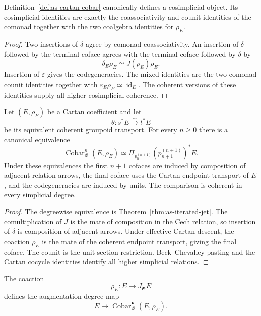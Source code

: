 \begin{proposition}
\label{prop:as-cartan-cobar-cosimplicial}
Definition~\ref{def:as-cartan-cobar} canonically defines a cosimplicial
object.  Its cosimplicial identities are exactly the coassociativity and
counit identities of the comonad together with the two coalgebra identities
for $\rho_E$.
\end{proposition}

\begin{proof}
Two insertions of $\delta$ agree by comonad coassociativity.  An insertion of
$\delta$ followed by the terminal coface agrees with the terminal coface
followed by $\delta$ by
\[
    \delta_E\rho_E
    \simeq
    J(\rho_E)\rho_E.
\]
Insertion of $\varepsilon$ gives the codegeneracies.  The mixed identities
are the two comonad counit identities together with
$\varepsilon_E\rho_E\simeq\operatorname{id}_E$.  The coherent versions of
these identities supply all higher cosimplicial coherence.
\end{proof}

\begin{theorem}
\label{thm:as-jet-cech-cobar}
Let $(E,\rho_E)$ be a Cartan coefficient and let
\[
    \theta:s^*E\xrightarrow{\sim}t^*E
\]
be its equivalent coherent groupoid transport.  For every $n\geq0$ there is
a canonical equivalence
\[
\boxed{
    \operatorname{Cobar}_{\mathfrak G}^{n}(E,\rho_E)
    \simeq
    \Pi_{p_0^{(n+1)}}
    (p_{n+1}^{(n+1)})^*E.
}
\]
Under these equivalences the first $n+1$ cofaces are induced by composition
of adjacent relation arrows, the final coface uses the Cartan endpoint
transport of $E$, and the codegeneracies are induced by units.  The
comparison is coherent in every simplicial degree.
\end{theorem}

\begin{proof}
The degreewise equivalence is
Theorem~\ref{thm:as-iterated-jet}.  The comultiplication of $J$ is the mate of
composition in the Cech relation, so insertion of $\delta$ is composition of
adjacent arrows.  Under effective Cartan descent, the coaction $\rho_E$ is
the mate of the coherent endpoint transport, giving the final coface.  The
counit is the unit-section restriction.  Beck--Chevalley pasting and the
Cartan cocycle identities identify all higher simplicial relations.
\end{proof}

\begin{definition}
\label{def:as-cart-coaugmentation}
The coaction
\[
    \rho_E:E\longrightarrow J_{\mathfrak G}E
\]
defines the augmentation-degree map
\[
\boxed{
    E\longrightarrow
    \operatorname{Cobar}_{\mathfrak G}^{\bullet}(E,\rho_E).
}
\]
\end{definition}

